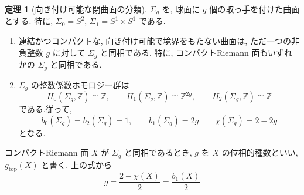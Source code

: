 \documentclass[dvipdfmx,a4paper,11pt]{article} %
\newcommand{\Z}{\mathbb{Z}}
\theoremstyle{definition}
\newtheorem{thm}{定理}[section]
\numberwithin{equation}{section}
\begin{document}
\begin{thm}[向き付け可能な閉曲面の分類]\label{O-M174}
$\Sigma_g$ を, 球面に $g$ 個の取っ手を付けた曲面とする.
特に, $\Sigma_0=S^2$, $\Sigma_1=S^1\times S^1$ である.


\begin{enumerate}
\item
連結かつコンパクトな, 向き付け可能で境界をもたない曲面は, 
ただ一つの非負整数 $g$ に対して $\Sigma_g$ と同相である.
特に, コンパクトRiemann 面もいずれかの $\Sigma_g$ と同相である.

\item 
$\Sigma_g$ の整数係数ホモロジー群は
\[
H_0(\Sigma_g,\Z)\cong\Z,\qquad
H_1(\Sigma_g,\Z)\cong\Z^{2g},\qquad
H_2(\Sigma_g,\Z)\cong\Z
\]
である.従って, 
\[
b_0(\Sigma_g)=b_2(\Sigma_g)=1,\qquad
b_1(\Sigma_g)=2g
\qquad
\chi(\Sigma_g)=2-2g
\]
となる.
\end{enumerate}
コンパクトRiemann 面 $X$ が $\Sigma_g$ と同相であるとき, 
$g$ を $X$ の位相的種数といい, $g_{\mathrm{top}}(X)$ と書く. 上の式から
\[
g=\frac{2-\chi(X)}2=\frac{b_1(X)}2
\]
\end{thm}
\end{document}
